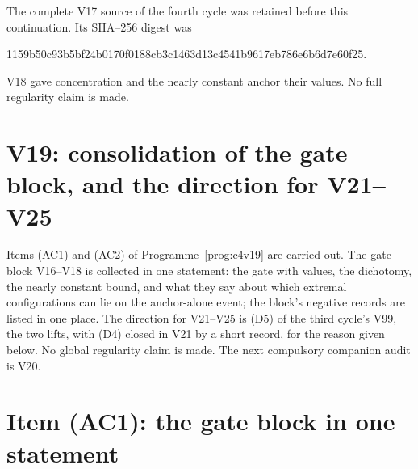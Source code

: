 \documentclass[11pt]{article}
\theoremstyle{plain}
\theoremstyle{definition}
\theoremstyle{remark}
\begin{document}
The complete V17 source of the fourth cycle was retained before this
continuation.  Its SHA--256 digest was
\begin{center}\scriptsize\ttfamily
1159b50c93b5bf24b0170f0188cb3c1463d13c4541b9617eb786e6b6d7e60f25.
\end{center}
V18 gave concentration and the nearly constant anchor their values.
No full regularity claim is made.

\section{V19: consolidation of the gate block, and the direction for V21--V25}
\label{sec:c4v19-entry}

Items (AC1) and (AC2) of Programme~\ref{prog:c4v19} are carried out.
The gate block V16--V18 is collected in one statement: the gate with
values, the dichotomy, the nearly constant bound, and what they say
about which extremal configurations can lie on the anchor-alone
event; the block's negative records are listed in one place.  The
direction for V21--V25 is (D5) of the third cycle's V99, the two
lifts, with (D4) closed in V21 by a short record, for the reason
given below.  No global regularity claim is made.  The next
compulsory companion audit is V20.

\section{Item (AC1): the gate block in one statement}
\label{sec:c4v19-block}
\end{document}
